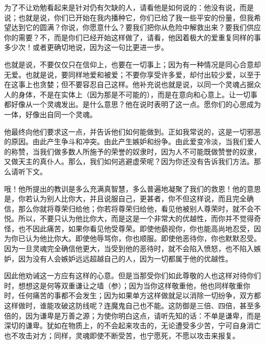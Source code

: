 为了不让劝勉看起来是针对仍有欠缺的人，请看他是如何说的：他没有说，而是说；也就是说，你们已开始在我内播种它，你们已给了我一些平安的份量，但我希望达到它的圆满？你说，你愿意什么？要我们把你从危险中解救出来？要我们供应你的需要？不，而是你们已经开始这样做了，请看，他因着极大的爱重复同样的事多少次！或者更确切地说，因为这一句比更进一步。\par

也就是说，不要仅仅只在信仰上，也要在一切事上；因为有一种情况是同心合意却无爱。也就是说，要同样地爱和被爱；不要你享受许多爱，却付出较少爱，以至于在这事上也贪婪；但不要容忍自己这样。他补充说也就是说，以同一个灵魂占据众人的身体，不是在实体上（因为那是不可能的），而是在意向和心意上。让一切事都好像从一个灵魂发出。是什么意思？他在说时表明了这一点。愿你们的心思成为一体，好像出自同一个灵魂。\par

 \par

他最终向他们要求这一点，并告诉他们如何能做到。正如我常说的，这是一切邪恶的原因。由此产生争斗和冲突。由此产生嫉妒和纷争。由此爱变冷淡，当我们爱人的称赞，当我们做多数人所施予的荣誉的奴隶时，因为人不可能既做赞誉的奴隶，又做天主的真仆人。那么，我们如何逃避虚荣呢？因为你还没有告诉我们方法。那么请听下文。\par

哦！他所提出的教训是多么充满真智慧，多么普遍地凝聚了我们的救恩！他的意思是，你若认为别人比你大，并且说服自己，更甚者，你不但这样说，而且完全确信，那么你就将尊荣归给他；你若将尊荣归给他，看见他被别人尊荣时，就不会不悦。所以，不要只认为他比你大，而是这是一个非常大的优越性，而你并不觉得奇怪，也不因此痛苦，如果你看见他受尊荣。即使他藐视你，你也能高尚地忍受，因为你已认为他比你大。即使他辱骂你，你也顺服。即使他恶待你，你也默默忍受。因为一旦灵魂完全确信他更大，当受到他的恶待时，就不会陷入愤怒，也不陷入嫉妒，因为没有人会嫉妒远远超越自己的人，因为一切都属于他的优越性。\par

因此他劝诫这一方应有这样的心意。但是当那受你们如此尊敬的人也这样对待你们时，想想这是何等双重谦让之墙（参）；因为当你这样敬重他，他也同样敬重你时，任何痛苦的事都不会发生；因为如果单方这样做就足以消除一切纷争，双方都这样做时，谁能攻破这防线呢？连魔鬼自己也不能。这防御是三倍、四倍，甚至多倍的，因为谦卑是万善之源；为使你明白这点，请听先知的话：不单是谦卑，而是深切的谦卑。犹如在物质上，的不会起来攻击的，无论遭受多少苦，宁可自身消亡也不攻击对方；同样，灵魂即使不断受苦，也宁愿死，不愿以攻击来报复。\par

